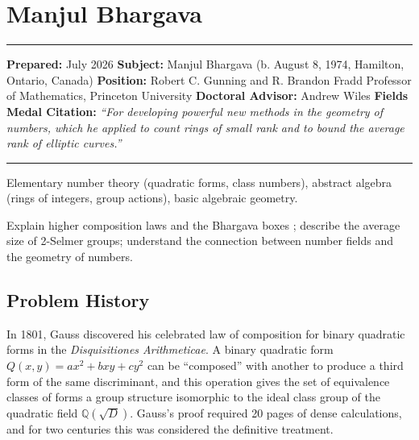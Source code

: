 \chapter{Manjul Bhargava}\label{ch2014manjulbhargava:manjul-bhargava-fields-medal-2014-a-comprehensive-report-on-his-work-and-impact}

\begin{center}\rule{0.5\linewidth}{0.5pt}\end{center}

\textbf{Prepared:} July 2026 \textbf{Subject:} Manjul Bhargava (b. August 8, 1974, Hamilton, Ontario, Canada) \textbf{Position:} Robert C. Gunning and R. Brandon Fradd Professor of Mathematics, Princeton University \textbf{Doctoral Advisor:} Andrew Wiles \textbf{Fields Medal Citation:} \emph{``For developing powerful new methods in the geometry of numbers, which he applied to count rings of small rank and to bound the average rank of elliptic curves.''}

\begin{center}\rule{0.5\linewidth}{0.5pt}\end{center}

\begin{prereqs} Elementary number theory (quadratic forms, class numbers), abstract algebra (rings of integers, group actions), basic algebraic geometry. \end{prereqs}

\begin{objectives} Explain higher composition laws and the Bhargava boxes \cite{bhargava2015}; describe the average size of 2-Selmer groups; understand the connection between number fields and the geometry of numbers. \end{objectives}

\section{Problem History}

In 1801, Gauss discovered his celebrated law of composition for binary quadratic forms in the \emph{Disquisitiones Arithmeticae}. A binary quadratic form $Q(x,y) = ax^2 + bxy + cy^2$ can be ``composed'' with another to produce a third form of the same discriminant, and this operation gives the set of equivalence classes of forms a group structure isomorphic to the ideal class group of the quadratic field $\mathbb{Q}(\sqrt{D})$. Gauss's proof required 20 pages of dense calculations, and for two centuries this was considered the definitive treatment.


